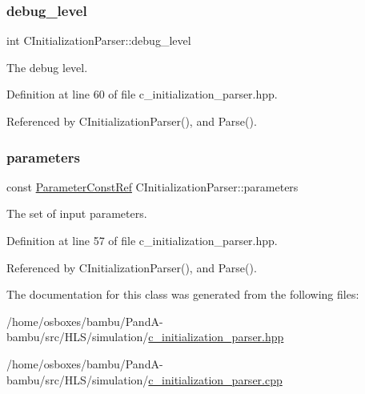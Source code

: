 \subsubsection{\texorpdfstring{debug\+\_\+level}{debug\_level}}
{\footnotesize\ttfamily int C\+Initialization\+Parser\+::debug\+\_\+level\hspace{0.3cm}{\ttfamily [private]}}



The debug level. 



Definition at line 60 of file c\+\_\+initialization\+\_\+parser.\+hpp.



Referenced by C\+Initialization\+Parser(), and Parse().

\mbox{\label{classCInitializationParser_a22401e9e15572a141c0d08a6290c612b}} 
\subsubsection{\texorpdfstring{parameters}{parameters}}
{\footnotesize\ttfamily const \hyperlink{Parameter_8hpp_a37841774a6fcb479b597fdf8955eb4ea}{Parameter\+Const\+Ref} C\+Initialization\+Parser\+::parameters\hspace{0.3cm}{\ttfamily [private]}}



The set of input parameters. 



Definition at line 57 of file c\+\_\+initialization\+\_\+parser.\+hpp.



Referenced by C\+Initialization\+Parser(), and Parse().



The documentation for this class was generated from the following files\+:\begin{DoxyCompactItemize}
\item 
/home/osboxes/bambu/\+Pand\+A-\/bambu/src/\+H\+L\+S/simulation/\hyperlink{c__initialization__parser_8hpp}{c\+\_\+initialization\+\_\+parser.\+hpp}\item 
/home/osboxes/bambu/\+Pand\+A-\/bambu/src/\+H\+L\+S/simulation/\hyperlink{c__initialization__parser_8cpp}{c\+\_\+initialization\+\_\+parser.\+cpp}\end{DoxyCompactItemize}

